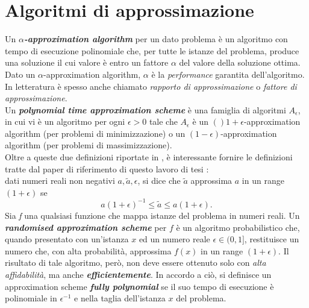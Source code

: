 \section{Algoritmi di approssimazione}
Un \textit{\textbf{$\alpha$-approximation algorithm}} per un dato problema è un algoritmo con tempo di esecuzione polinomiale che, per tutte le istanze del problema, produce una soluzione il cui valore è entro un fattore $\alpha$ del valore della soluzione ottima.\\
Dato un $\alpha$-approximation algorithm, $\alpha$ è la \textit{performance} garantita dell'algoritmo. In letteratura è spesso anche chiamato \textit{rapporto di approssimazione} o \textit{fattore di approssimazione}.\\
Un \textit{\textbf{polynomial time approximation scheme}} è una famiglia di algoritmi ${A_\epsilon}$, in cui vi è un algoritmo per ogni $\epsilon > 0$ tale che $A_\epsilon$ è un $()1+\epsilon$-approximation algorithm (per problemi di minimizzazione) o un $(1-\epsilon)$-approximation algorithm (per problemi di massimizzazione).\\
Oltre a queste due definizioni riportate in \cite{williamson2011design}, è interessante fornire le definizioni tratte dal paper di riferimento di questo lavoro di tesi \cite{jerrum1993polynomial}:\\
dati numeri reali non negativi $a, \tilde{a}, \epsilon$, si dice che $\tilde{a}$ approssima $a$ in un range $(1+\epsilon)$ se
\begin{equation}
	a(1+\epsilon)^{-1} \leq \tilde{a} \leq a(1+\epsilon).
\end{equation}
Sia \textit{f} una qualsiasi funzione che mappa istanze del problema in numeri reali. Un \textit{\textbf{randomised approximation scheme}} per $f$ è un algoritmo probabilistico che, quando presentato con un'istanza $x$ ed un numero reale $\epsilon \in (0,1]$, restituisce un numero che, con alta probabilità, approssima $f(x)$ in un range $(1+\epsilon)$. Il risultato di tale algoritmo, però, non deve essere ottenuto solo con \textit{alta affidabilità}, ma anche \textit{\textbf{efficientemente}}. In accordo a ciò, si definisce un approximation scheme \textit{\textbf{fully polynomial}} se il suo tempo di esecuzione è polinomiale in $\epsilon^{-1}$ e nella taglia dell'istanza $x$ del problema.
